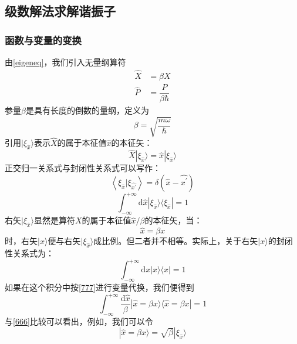\documentclass[]{article}
\begin{document}
\subsection{级数解法求解谐振子}
\subsubsection{函数与变量的变换}
由\eqref{eigeneq}，我们引入无量纲算符
\begin{align}
	\widehat{X}&=\beta X\nonumber\\
	\widehat{P}&=\dfrac{P}{\beta\hbar}
\end{align}
参量$\beta$是具有长度的倒数的量纲，定义为
\begin{equation}
	\beta=\sqrt{\dfrac{m\omega}{\hbar}}
\end{equation}
引用$|\xi_{\widehat{x}}\rangle$表示$\widehat{X}$的属于本征值$\widehat{x}$的本征矢：
\begin{equation}
	\widehat{X}|\xi_{\widehat{x}}\rangle=\widehat{x}|\xi_{\widehat{x}}\rangle
\end{equation}
正交归一关系式与封闭性关系式可以写作：
\begin{equation}
	\left\langle \xi_{\widehat{x}}|\xi_{\widehat{x^\prime}}\right\rangle =\delta(\widehat{x}-\widehat{x^\prime})
\end{equation}
\begin{equation}
	\int^{+\infty}_{-\infty}\mathrm{d}\widehat{x}|\xi_{\widehat{x}}\rangle\langle\xi_{\widehat{x}}|=1
	\label{666}
\end{equation}
右矢$|\xi_{\widehat{x}}\rangle$显然是算符$X$的属于本征值$\widehat{x}/\beta $的本征矢，当：
\begin{equation}
	\widehat{x}=\beta x
	\label{777}
\end{equation}
时，右矢$|x\rangle$便与右矢$|\xi_{\widehat{x}}\rangle$成比例。但二者并不相等。实际上，关于右矢$|x\rangle$的封闭性关系式为：
\begin{equation}
	\int^{+\infty}_{-\infty}\mathrm{d}x|x\rangle\langle x|=1
\end{equation}
如果在这个积分中按\eqref{777}进行变量代换，我们便得到
\begin{equation}
	\int^{+\infty}_{-\infty}\dfrac{\mathrm{d}\widehat{x}}{\beta}|\widehat{x}=\beta x\rangle\langle \widehat{x}=\beta x|=1
\end{equation}
与\eqref{666}比较可以看出，例如，我们可以令
\begin{equation}
	|\widehat{x}=\beta x\rangle=\sqrt{\beta}|\xi_{\widehat{x}}\rangle
\end{equation}
\end{document}
